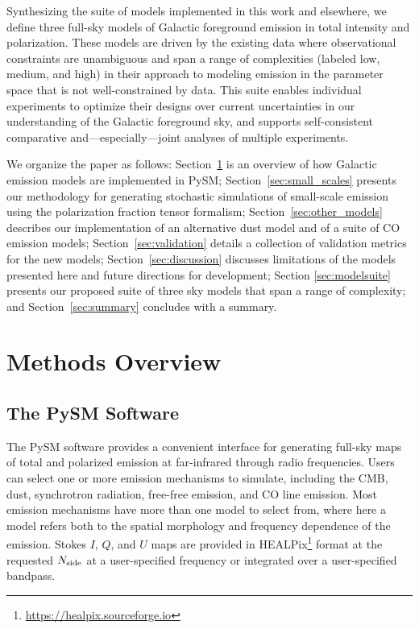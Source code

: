\documentclass[twocolumn]{aastex631}
\begin{document}
Synthesizing the suite of models implemented in this work and elsewhere, we define three full-sky models of Galactic foreground emission in total intensity and polarization. These models are driven by the existing data where observational constraints are unambiguous and span a range of complexities (labeled low, medium, and high) in their approach to modeling emission in the parameter space that is not well-constrained by data. This suite enables individual experiments to optimize their designs over current uncertainties in our understanding of the Galactic foreground sky, and supports self-consistent comparative and---especially---joint analyses of multiple experiments.

We organize the paper as follows: Section~\ref{sec:methods} is an overview of how Galactic emission models are implemented in PySM; Section~\ref{sec:small_scales} presents our methodology for generating stochastic simulations of small-scale emission using the polarization fraction tensor formalism; Section~\ref{sec:other_models} describes our implementation of an alternative dust model and of a suite of CO emission models; Section~\ref{sec:validation} details a collection of validation metrics for the new models; Section~\ref{sec:discussion} discusses limitations of the models presented here and future directions for development; Section \ref{sec:modelsuite} presents our proposed suite of three sky models that span a range of complexity; and Section~\ref{sec:summary} concludes with a summary.

\section{Methods Overview} \label{sec:methods}

\subsection{The PySM Software}
The PySM software provides a convenient interface for generating full-sky maps of total and polarized emission at far-infrared through radio frequencies. Users can select one or more emission mechanisms to simulate, including the CMB, dust, synchrotron radiation, free-free emission, and CO line emission. Most emission mechanisms have more than one model to select from, where here a model refers both to the spatial morphology and frequency dependence of the emission. Stokes $I$, $Q$, and $U$ maps are provided in HEALPix\footnote{\url{https://healpix.sourceforge.io}}  \citep{Gorski:2005} format at the requested $N_{\rm side}$ at a user-specified frequency or integrated over a user-specified bandpass.
\end{document}
